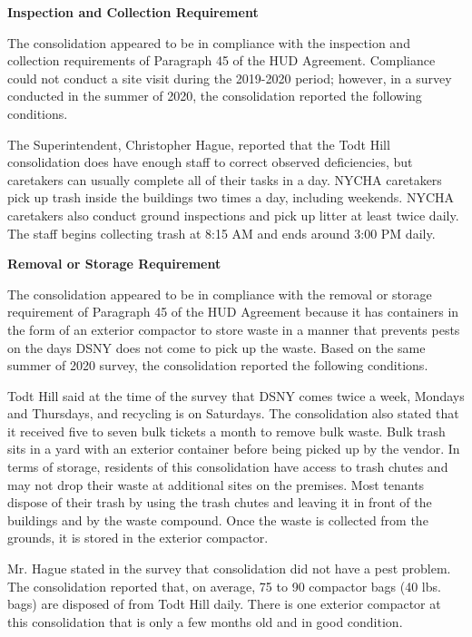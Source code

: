  

\textbf{Inspection and Collection Requirement} 

 

The consolidation appeared to be in compliance with the inspection and collection requirements of Paragraph 45 of the HUD Agreement. Compliance could not conduct a site visit during the 2019-2020 period; however, in a survey conducted in the summer of 2020, the consolidation reported the following conditions.

The Superintendent, Christopher Hague, reported that the Todt Hill consolidation does have enough staff to correct observed deficiencies, but caretakers can usually complete all of their tasks in a day. NYCHA caretakers pick up trash inside the buildings two times a day, including weekends. NYCHA caretakers also conduct ground inspections and pick up litter at least twice daily. The staff begins collecting trash at 8:15 AM and ends around 3:00 PM daily.

\textbf{Removal or Storage Requirement} 

The consolidation appeared to be in compliance with the removal or storage requirement of Paragraph  45 of the HUD Agreement because it has containers in the form of an exterior compactor to store waste in a manner that prevents pests on the days DSNY does not come to pick up the waste. Based on the same summer of  2020  survey, the consolidation reported the following conditions.

  

Todt Hill said at the time of the survey that DSNY comes twice a week, Mondays and Thursdays, and recycling is on Saturdays. The consolidation also stated that it received five to seven bulk tickets a month to remove bulk waste.  Bulk trash sits in a yard with an exterior container before being picked up by the vendor.  In terms of storage, residents of this consolidation have access to trash chutes and may not drop their waste at additional sites on the premises. Most tenants dispose of their trash by using the trash chutes and leaving it in front of the buildings and by the waste compound. Once the waste is collected from the grounds, it is stored in the exterior compactor.  

 

Mr. Hague stated in the survey that consolidation did not have a pest problem. The consolidation reported that, on average, 75 to 90 compactor bags (40 lbs. bags)  are disposed of from Todt Hill daily. There is one exterior compactor at this consolidation that is only a few months old and in good condition. 


